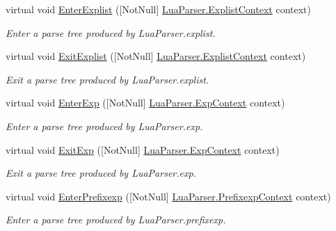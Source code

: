 \begin{DoxyCompactItemize}
virtual void \mbox{\hyperlink{classzlua_1_1_lua_base_listener_a831fc10bcf2d08ebad6ac9768deb4230}{Enter\+Explist}} (\mbox{[}Not\+Null\mbox{]} \mbox{\hyperlink{classzlua_1_1_lua_parser_1_1_explist_context}{Lua\+Parser.\+Explist\+Context}} context)
\begin{DoxyCompactList}\small\item\em Enter a parse tree produced by Lua\+Parser.\+explist. \end{DoxyCompactList}\item 
virtual void \mbox{\hyperlink{classzlua_1_1_lua_base_listener_a35af8fb9b7bc09c657281846943392a8}{Exit\+Explist}} (\mbox{[}Not\+Null\mbox{]} \mbox{\hyperlink{classzlua_1_1_lua_parser_1_1_explist_context}{Lua\+Parser.\+Explist\+Context}} context)
\begin{DoxyCompactList}\small\item\em Exit a parse tree produced by Lua\+Parser.\+explist. \end{DoxyCompactList}\item 
virtual void \mbox{\hyperlink{classzlua_1_1_lua_base_listener_a7a7e4ba1a91e217503b568da1213eaf4}{Enter\+Exp}} (\mbox{[}Not\+Null\mbox{]} \mbox{\hyperlink{classzlua_1_1_lua_parser_1_1_exp_context}{Lua\+Parser.\+Exp\+Context}} context)
\begin{DoxyCompactList}\small\item\em Enter a parse tree produced by Lua\+Parser.\+exp. \end{DoxyCompactList}\item 
virtual void \mbox{\hyperlink{classzlua_1_1_lua_base_listener_aa397d17db00c6af6db3c06a7a35da3c8}{Exit\+Exp}} (\mbox{[}Not\+Null\mbox{]} \mbox{\hyperlink{classzlua_1_1_lua_parser_1_1_exp_context}{Lua\+Parser.\+Exp\+Context}} context)
\begin{DoxyCompactList}\small\item\em Exit a parse tree produced by Lua\+Parser.\+exp. \end{DoxyCompactList}\item 
virtual void \mbox{\hyperlink{classzlua_1_1_lua_base_listener_ac17b7407bccd562c7786ef788558e767}{Enter\+Prefixexp}} (\mbox{[}Not\+Null\mbox{]} \mbox{\hyperlink{classzlua_1_1_lua_parser_1_1_prefixexp_context}{Lua\+Parser.\+Prefixexp\+Context}} context)
\begin{DoxyCompactList}\small\item\em Enter a parse tree produced by Lua\+Parser.\+prefixexp. \end{DoxyCompactList}\item 

\end{DoxyCompactItemize}
